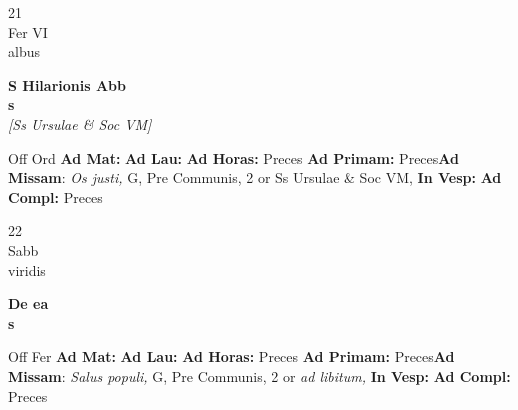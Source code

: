 \documentclass[10pt, openany]{book}
\begin{document}
    \begin{center}
        \begin{minipage}{3.5in}
            \vspace{2em}
            \begin{minipage}{0.5in}
                {\Huge 21} \\
                {\normalsize Fer VI} \\
                {\normalsize albus}
            \end{minipage}
            \begin{minipage}{3.0in}
                \textbf{ \large S Hilarionis Abb \\
                \textnormal{\normalsize s}} \\ \textit{[Ss Ursulae \& Soc VM]} \\ 
            \end{minipage}
            \begin{justify}Off Ord
                \textbf{Ad Mat: }
                \textbf{Ad Lau: }
                \textbf{Ad Horas: }Preces
                \textbf{Ad Primam: }Preces\textbf{Ad Missam}: \textit{Os justi,} G, Pre Communis, 2 or Ss Ursulae \& Soc VM,  
                \textbf{In Vesp: }
                \textbf{Ad Compl: }Preces
            \end{justify}
        \end{minipage}
    \end{center}

    \begin{center}
        \begin{minipage}{3.5in}
            \vspace{2em}
            \begin{minipage}{0.5in}
                {\Huge 22} \\
                {\normalsize Sabb} \\
                {\normalsize viridis}
            \end{minipage}
            \begin{minipage}{3.0in}
                \textbf{ \large De ea \\
                \textnormal{\normalsize s}} \\ 
            \end{minipage}
            \begin{justify}Off Fer
                \textbf{Ad Mat: }
                \textbf{Ad Lau: }
                \textbf{Ad Horas: }Preces
                \textbf{Ad Primam: }Preces\textbf{Ad Missam}: \textit{Salus populi,} G, Pre Communis, 2 or \textit{ad libitum,}  
                \textbf{In Vesp: }
                \textbf{Ad Compl: }Preces
            \end{justify}
        \end{minipage}
    \end{center}
\end{document}
